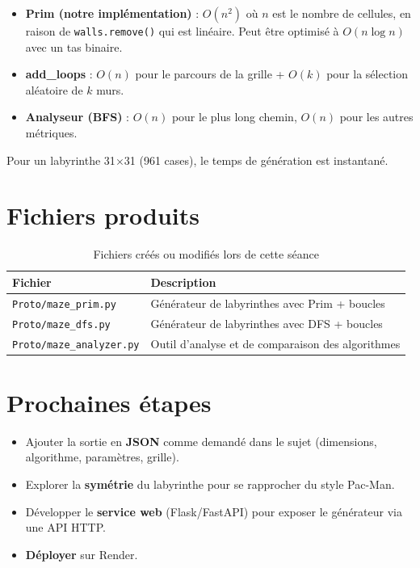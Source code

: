 \documentclass[12pt,a4paper]{article}
\begin{document}
\begin{itemize}
    \item \textbf{Prim (notre implémentation)} : $O(n^2)$ où $n$ est le nombre de cellules, en raison de \texttt{walls.remove()} qui est linéaire. Peut être optimisé à $O(n \log n)$ avec un tas binaire.
    \item \textbf{add\_loops} : $O(n)$ pour le parcours de la grille + $O(k)$ pour la sélection aléatoire de $k$ murs.
    \item \textbf{Analyseur (BFS)} : $O(n)$ pour le plus long chemin, $O(n)$ pour les autres métriques.
\end{itemize}

Pour un labyrinthe 31$\times$31 (961 cases), le temps de génération est instantané.

\section{Fichiers produits}

\begin{table}[h]
\centering
\begin{tabular}{ll}
\toprule
\textbf{Fichier} & \textbf{Description} \\
\midrule
\texttt{Proto/maze\_prim.py}     & Générateur de labyrinthes avec Prim + boucles \\
\texttt{Proto/maze\_dfs.py}      & Générateur de labyrinthes avec DFS + boucles \\
\texttt{Proto/maze\_analyzer.py} & Outil d'analyse et de comparaison des algorithmes \\
\bottomrule
\end{tabular}
\caption{Fichiers créés ou modifiés lors de cette séance}
\end{table}

\section{Prochaines étapes}

\begin{itemize}
    \item Ajouter la sortie en \textbf{JSON} comme demandé dans le sujet (dimensions, algorithme, paramètres, grille).
    \item Explorer la \textbf{symétrie} du labyrinthe pour se rapprocher du style Pac-Man.
    \item Développer le \textbf{service web} (Flask/FastAPI) pour exposer le générateur via une API HTTP.
    \item \textbf{Déployer} sur Render.
\end{itemize}
\end{document}
